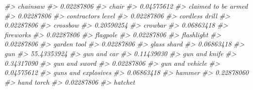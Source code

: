 \documentclass[
]{krantz}
\makeatletter
\newenvironment{Shaded}{\begin{snugshade}}{\end{snugshade}}
\newcommand{\CommentTok}[1]{\textcolor[rgb]{0.37,0.37,0.37}{\textit{#1}}}
\newenvironment{kframe}{%
\medskip{}
\setlength{\fboxsep}{.8em}
 \def\at@end@of@kframe{}%
 \ifinner\ifhmode%
  \def\at@end@of@kframe{\end{minipage}}%
  \begin{minipage}{\columnwidth}%
 \fi\fi%
 \def\FrameCommand##1{\hskip\@totalleftmargin \hskip-\fboxsep
 \colorbox{shadecolor}{##1}\hskip-\fboxsep
     \hskip-\linewidth \hskip-\@totalleftmargin \hskip\columnwidth}%
 \MakeFramed {\advance\hsize-\width
   \@totalleftmargin\z@ \linewidth\hsize
   \@setminipage}}%
 {\par\unskip\endMakeFramed%
 \at@end@of@kframe}
\renewenvironment{Shaded}{\begin{kframe}}{\end{kframe}}
\makeatother
\begin{document}
\begin{Shaded}
\begin{Highlighting}[]
\CommentTok{\#\textgreater{}                         chainsaw }
\CommentTok{\#\textgreater{}                       0.02287806 }
\CommentTok{\#\textgreater{}                            chair }
\CommentTok{\#\textgreater{}                       0.04575612 }
\CommentTok{\#\textgreater{}              claimed to be armed }
\CommentTok{\#\textgreater{}                       0.02287806 }
\CommentTok{\#\textgreater{}               contractor\textquotesingle{}s level }
\CommentTok{\#\textgreater{}                       0.02287806 }
\CommentTok{\#\textgreater{}                   cordless drill }
\CommentTok{\#\textgreater{}                       0.02287806 }
\CommentTok{\#\textgreater{}                         crossbow }
\CommentTok{\#\textgreater{}                       0.20590254 }
\CommentTok{\#\textgreater{}                          crowbar }
\CommentTok{\#\textgreater{}                       0.06863418 }
\CommentTok{\#\textgreater{}                        fireworks }
\CommentTok{\#\textgreater{}                       0.02287806 }
\CommentTok{\#\textgreater{}                         flagpole }
\CommentTok{\#\textgreater{}                       0.02287806 }
\CommentTok{\#\textgreater{}                       flashlight }
\CommentTok{\#\textgreater{}                       0.02287806 }
\CommentTok{\#\textgreater{}                      garden tool }
\CommentTok{\#\textgreater{}                       0.02287806 }
\CommentTok{\#\textgreater{}                      glass shard }
\CommentTok{\#\textgreater{}                       0.06863418 }
\CommentTok{\#\textgreater{}                              gun }
\CommentTok{\#\textgreater{}                      55.43353924 }
\CommentTok{\#\textgreater{}                      gun and car }
\CommentTok{\#\textgreater{}                       0.11439030 }
\CommentTok{\#\textgreater{}                    gun and knife }
\CommentTok{\#\textgreater{}                       0.34317090 }
\CommentTok{\#\textgreater{}                    gun and sword }
\CommentTok{\#\textgreater{}                       0.02287806 }
\CommentTok{\#\textgreater{}                  gun and vehicle }
\CommentTok{\#\textgreater{}                       0.04575612 }
\CommentTok{\#\textgreater{}              guns and explosives }
\CommentTok{\#\textgreater{}                       0.06863418 }
\CommentTok{\#\textgreater{}                           hammer }
\CommentTok{\#\textgreater{}                       0.22878060 }
\CommentTok{\#\textgreater{}                       hand torch }
\CommentTok{\#\textgreater{}                       0.02287806 }
\CommentTok{\#\textgreater{}                          hatchet }

\end{Highlighting}
\end{Shaded}
\end{document}

